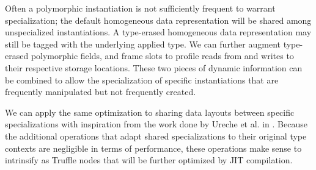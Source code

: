 Often a polymorphic instantiation is not sufficiently frequent to warrant specialization; the default homogeneous data representation will be shared among unspecialized instantiations.
A type-erased homogeneous data representation may still be tagged with the underlying applied type.
We can further augment type-erased polymorphic fields, and frame slots to profile reads from and writes to their respective storage locations.
These two pieces of dynamic information can be combined to allow the specialization of specific instantiations that are frequently manipulated but not frequently created.

We can apply the same optimization to sharing data layouts between specific specializations with inspiration from the work done by Ureche et al. in \cite{scala:miniboxing}.
Because the additional operations that adapt shared specializations to their original type contexts are negligible in terms of performance\cite{scala:miniboxing}, these operations make sense to intrinsify as Truffle nodes that will be further optimized by JIT compilation.
